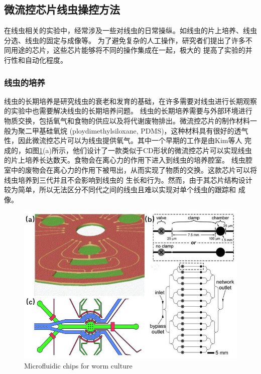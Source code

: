 \subsection{微流控芯片线虫操控方法}
	在线虫相关的实验中，经常涉及一些对线虫的日常操纵。如线虫的片上培养、线虫分选、线虫的固定与成像等。
	为了避免复杂的人工操作，研究者们提出了许多不同用途的芯片，这些芯片能够将不同的操作集成在一起，极大的
	提高了实验的并行性和自动化程度。
	
\subsubsection{线虫的培养}
\label{sec:intro:analog}
	线虫的长期培养是研究线虫的衰老和发育的基础，在许多需要对线虫进行长期观察的实验中也需要解决线虫的长期培养问题。
	线虫的长期培养需要与外部环境进行物质交换，包括氧气和食物的供应以及将代谢废物排出。微流控芯片的制作材料一般为聚二甲基硅氧烷
	(ploydimethylsiloxane, PDMS)，这种材料具有很好的透气性，因此微流控芯片可以为线虫提供氧气。其中一个早期的工作是由Kim等人\cite{Kim2007Automated}
	完成的，如图\ref{fig:cd}(a)所示，他们设计了一款类似于CD形状的微流控芯片可以实现线虫的片上培养长达数天。食物会在离心力的作用下进入到线虫的培养腔室。
	线虫腔室中的废物会在离心力的作用下被甩出，从而实现了物质的交换。这款芯片可以将线虫培养到三代并且不会影响到线虫的
	生长和行为。然而，由于其芯片结构设计较为简单，所以无法区分不同代之间的线虫且难以实现对单个线虫的跟踪和
	成像。
	\begin{figure}[h]
	  \centering
	  \includegraphics[width=12cm]{figure/chap1/wormculture.jpg}
		{Microfluidic chips for worm culture}
	  \label{fig:cd}
	\end{figure}
	
